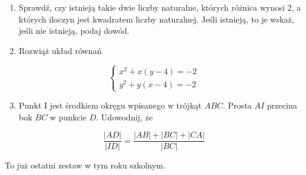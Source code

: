 \documentclass[10pt]{article}
\begin{document}
\begin{enumerate}
  \item Sprawdź, czy istnieją takie dwie liczby naturalne, których różnica wynosi 2, a których iloczyn jest kwadratem liczby naturalnej. Jeśli istnieją, to je wskaż, jeśli nie istnieją, podaj dowód.
  \item Rozwiąż układ równań
\end{enumerate}

\[
\left\{\begin{array}{l}
x^{2}+x(y-4)=-2 \\
y^{2}+y(x-4)=-2
\end{array}\right.
\]

\begin{enumerate}
  \setcounter{enumi}{2}
  \item Punkt I jest środkiem okręgu wpisanego w trójkąt \(A B C\). Prosta \(A I\) przecina bok \(B C\) w punkcie \(D\). Udowodnij, że
\end{enumerate}

\[
\frac{|A D|}{|I D|}=\frac{|A B|+|B C|+|C A|}{|B C|}
\]

To już ostatni zestaw w tym roku szkolnym.
\end{document}
